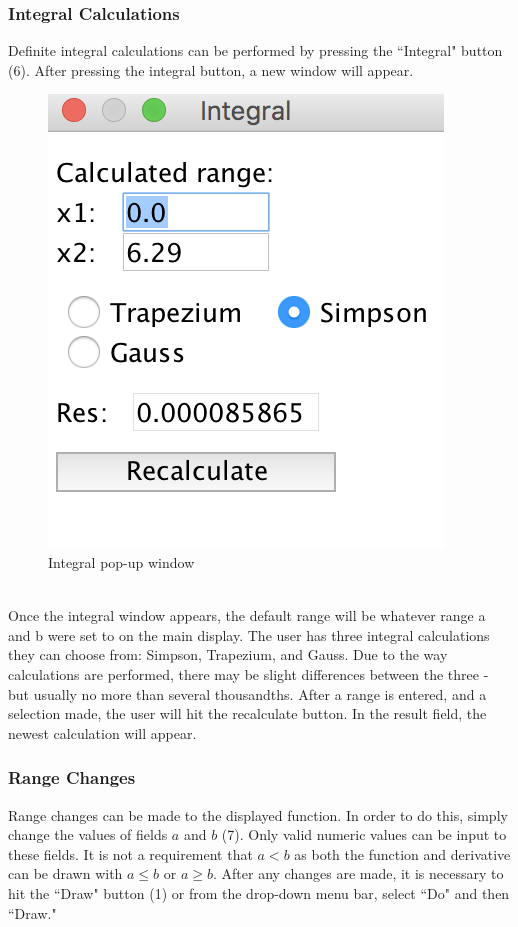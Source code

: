 \documentclass{article}[12 pt]
\begin{document}
			\subsubsection{Integral Calculations}
			Definite integral calculations can be performed by pressing the ``Integral" button (6). After pressing the integral button, a new window will appear.
				\begin{figure}[h!]
					\centering
					\includegraphics[scale=.5]{integral}
					\caption{Integral pop-up window}
				\end{figure}\\
				Once the integral window appears, the default range will be whatever range a and b were set to on the main display. The user has three integral calculations they can choose from: Simpson, Trapezium, and Gauss. Due to the way calculations are performed, there may be slight differences between the three - but usually no more than several thousandths. After a range is entered, and a selection made, the user will hit the recalculate button. In the result field, the newest calculation will appear.
				
			\subsubsection{Range Changes}
 			Range changes can be made to the displayed function. In order to do this, simply change the values of fields $a$ and $b$ (7). Only valid numeric values can be input to these fields. It is not a requirement that $a < b$ as both the function and derivative can be drawn with $a \leq b$ or $a \geq b$. After any changes are made, it is necessary to hit the ``Draw" button (1) or from the drop-down menu bar, select ``Do" and then ``Draw."
			
\end{document}
